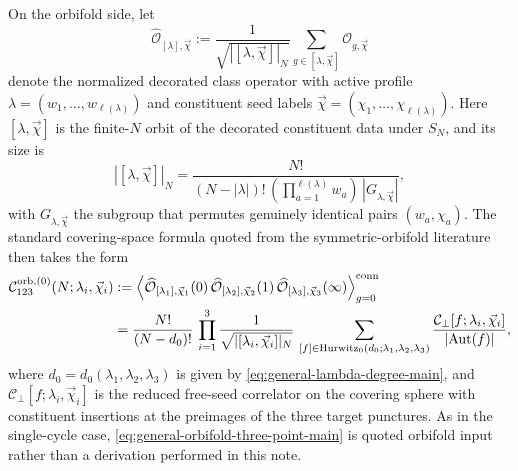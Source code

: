 \documentclass[11pt]{article}
\newcommand{\mc}[1]{\mathcal{#1}}
\begin{document}
On the orbifold side, let
\begin{equation}\label{eq:decorated-class-operator}
\widehat{\mc O}_{[\lambda],\vec\chi}
:=
\frac{1}{\sqrt{|[\lambda,\vec\chi]|_N}}
\sum_{g\in [\lambda,\vec\chi]}
\mc O_{g,\vec\chi}
\end{equation}
denote the normalized decorated class operator with active profile $\lambda=(w_1,\dots,w_{\ell(\lambda)})$ and constituent seed labels $\vec\chi=(\chi_1,\dots,\chi_{\ell(\lambda)})$. Here $[\lambda,\vec\chi]$ is the finite-$N$ orbit of the decorated constituent data under $S_N$, and its size is
\begin{equation}\label{eq:decorated-class-size-main}
|[\lambda,\vec\chi]|_N
=
\frac{N!}{
(N-|\lambda|)!\,
\left(\prod_{a=1}^{\ell(\lambda)} w_a\right)\,
|G_{\lambda,\vec\chi}|
},
\end{equation}
with $G_{\lambda,\vec\chi}$ the subgroup that permutes genuinely identical pairs $(w_a,\chi_a)$. The standard covering-space formula quoted from the symmetric-orbifold literature then takes the form
\begin{equation}\label{eq:general-orbifold-three-point-main}
\begin{aligned}
\mc C_{123}^{\rm orb,(0)}(N;\lambda_i,\vec\chi_i)
&:=
\left\langle
\widehat{\mc O}_{[\lambda_1],\vec\chi_1}(0)\,
\widehat{\mc O}_{[\lambda_2],\vec\chi_2}(1)\,
\widehat{\mc O}_{[\lambda_3],\vec\chi_3}(\infty)
\right\rangle^{\rm conn}_{g=0}
\\
&=
\frac{N!}{(N-d_0)!}\,
\prod_{i=1}^3 \frac{1}{\sqrt{|[\lambda_i,\vec\chi_i]|_N}}\,
\sum_{[f]\in \mathrm{Hurwitz}_0(d_0;\lambda_1,\lambda_2,\lambda_3)}
\frac{\mc C_\perp[f;\lambda_i,\vec\chi_i]}{|\mathrm{Aut}(f)|},
\end{aligned}
\end{equation}
where $d_0=d_0(\lambda_1,\lambda_2,\lambda_3)$ is given by \eqref{eq:general-lambda-degree-main}, and $\mc C_\perp[f;\lambda_i,\vec\chi_i]$ is the reduced free-seed correlator on the covering sphere with constituent insertions at the preimages of the three target punctures. As in the single-cycle case, \eqref{eq:general-orbifold-three-point-main} is quoted orbifold input rather than a derivation performed in this note.
\end{document}
